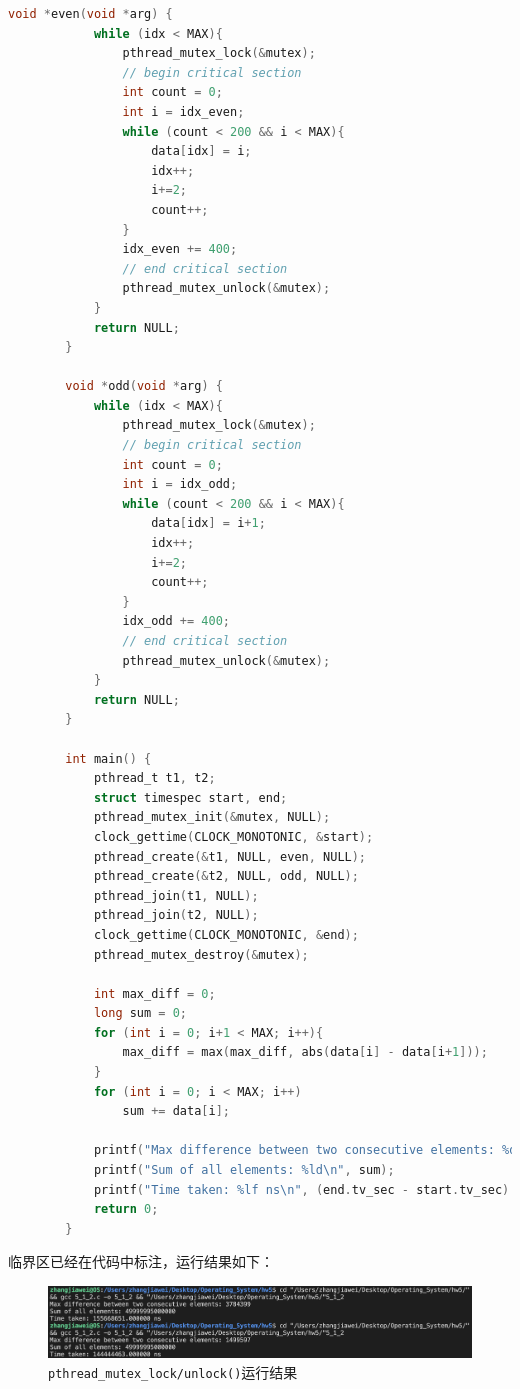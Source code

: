 \documentclass[UTF8]{report}
\begin{document}
\begin{enumerate}[label=(\arabic*)]
\begin{lstlisting}[language=C]
        void *even(void *arg) {
            while (idx < MAX){
                pthread_mutex_lock(&mutex);
                // begin critical section
                int count = 0;
                int i = idx_even;
                while (count < 200 && i < MAX){
                    data[idx] = i;
                    idx++;
                    i+=2;
                    count++;
                }
                idx_even += 400;
                // end critical section
                pthread_mutex_unlock(&mutex); 
            }
            return NULL;
        }
        
        void *odd(void *arg) {
            while (idx < MAX){
                pthread_mutex_lock(&mutex);
                // begin critical section
                int count = 0;
                int i = idx_odd;
                while (count < 200 && i < MAX){
                    data[idx] = i+1;
                    idx++;
                    i+=2;
                    count++;
                }
                idx_odd += 400;
                // end critical section
                pthread_mutex_unlock(&mutex);
            }
            return NULL;
        }
        
        int main() {
            pthread_t t1, t2;
            struct timespec start, end;
            pthread_mutex_init(&mutex, NULL);
            clock_gettime(CLOCK_MONOTONIC, &start);
            pthread_create(&t1, NULL, even, NULL);
            pthread_create(&t2, NULL, odd, NULL);
            pthread_join(t1, NULL);
            pthread_join(t2, NULL);
            clock_gettime(CLOCK_MONOTONIC, &end);
            pthread_mutex_destroy(&mutex);
        
            int max_diff = 0;
            long sum = 0;
            for (int i = 0; i+1 < MAX; i++){
                max_diff = max(max_diff, abs(data[i] - data[i+1]));
            }
            for (int i = 0; i < MAX; i++)
                sum += data[i];    
            
            printf("Max difference between two consecutive elements: %d\n", max_diff);
            printf("Sum of all elements: %ld\n", sum);
            printf("Time taken: %lf ns\n", (end.tv_sec - start.tv_sec) * 1e9 + (end.tv_nsec - start.tv_nsec));
            return 0;
        }
    \end{lstlisting}

    临界区已经在代码中标注，运行结果如下：

    \begin{figure}[H]
      \centering
      \includegraphics[width=\textwidth]{5_1_2.png}
      \caption{\texttt{pthread\_mutex\_lock/unlock()}运行结果}
    \end{figure}


\end{enumerate}
\end{document}
